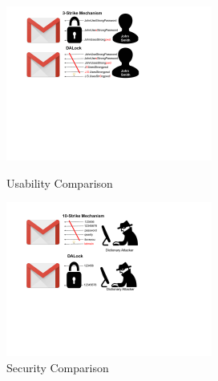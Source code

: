 




\begin{figure}[htb]
	
	
	\begin{center}
		
		
		\includegraphics[height=2in,width=\linewidth]{Figures/Introduction/Usability.pdf}
		
		
		\caption{Usability Comparison}\label{figure:introduction_usability}
		
		
		\includegraphics[height=2in,width=\linewidth]{Figures/Introduction/Security.pdf}
		
		
		\caption{Security Comparison}\label{figure:introduction_security}
		
		
	\end{center}
	
	
	\vspace{-0.8cm}
	
	
\end{figure}




